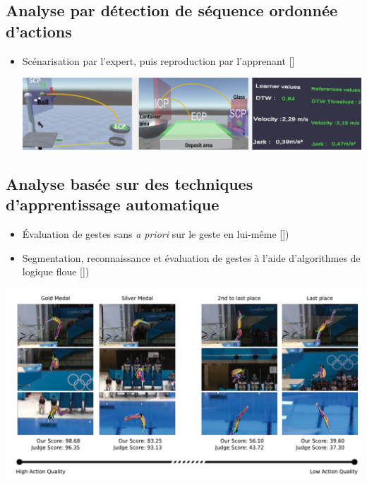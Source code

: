 \documentclass[svgnames]{beamer}
\newcommand{\mycite}[1]{[\textit{\cite{#1}}]}
\begin{document}
	\subsection{Analyse par détection de séquence ordonnée d'actions}
	\begin{frame}{\subsecname}
		\begin{itemize}[label=$\bullet$]
			\item Scénarisation par l'expert, puis reproduction par l'apprenant \mycite{Mahdi2019TaE, Delest2019MaE}	
			
			\vspace{1cm}
			
			\centering
				\includegraphics[scale=0.4]{img/Delest_system.png}
		\end{itemize}
	\end{frame}
	
	\subsection{Analyse basée sur des techniques d'apprentissage automatique}
	\begin{frame}{\subsecname}
		\begin{itemize}[label=$\bullet$]
			\item Évaluation de gestes sans \textit{a priori} sur le geste en lui-même \mycite{Pirsiavash2014AQA})
			\item Segmentation, reconnaissance et évaluation de gestes à l'aide d'algorithmes de logique floue \mycite{Patrona2018MaA})
		\end{itemize}
		
		\centering
		\includegraphics[scale=0.3]{img/olympic_games.png}
	\end{frame}
	
\end{document}
